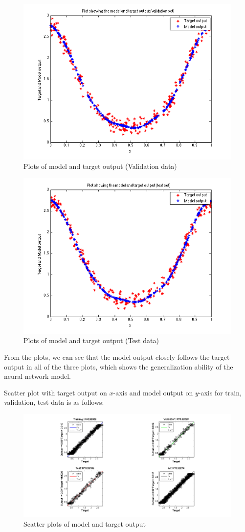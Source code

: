 \documentclass{article}
\begin{document}
\begin{figure}[H]
\centering
\includegraphics[width=0.5\linewidth]{Regression/univariate/valOutput.png}
\caption{Plots of model and target output (Validation data)}
\end{figure}

\begin{figure}[H]
\centering
\includegraphics[width=0.5\linewidth]{Regression/univariate/testOutput.png}
\caption{Plots of model and target output (Test data)}
\end{figure}

\begin{flushleft}
From the plots, we can see that the model output closely follows the target output in all of the three plots, which shows the generalization ability of the neural network model.

Scatter plot with target output on $x$-axis and model output on $y$-axis for train, validation, test data is as follows:

\end{flushleft}

\begin{figure}[H]
\centering
\includegraphics[width=1.2\linewidth]{Regression/univariate/Scatter_plots.png}
\caption{Scatter plots of model and target output}
\end{figure}
\end{document}
